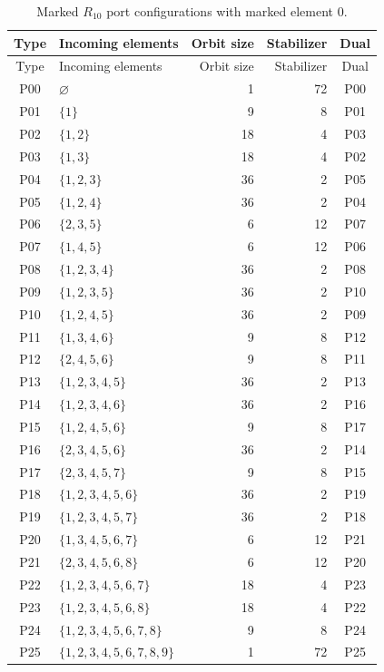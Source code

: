 \documentclass[11pt]{article}
\numberwithin{equation}{section}
\theoremstyle{remark}
\begin{document}
\begin{center}
\small
\begin{longtable}{c l r r c}
\caption{Marked $R_{10}$ port configurations with marked element $0$.}\label{tab:r10-marked-configurations}\\
\hline
Type & Incoming elements & Orbit size & Stabilizer & Dual \\
\hline
\endfirsthead
\hline
Type & Incoming elements & Orbit size & Stabilizer & Dual \\
\hline
\endhead
P00 & $\varnothing$ & 1 & 72 & P00 \\
P01 & $\{1\}$ & 9 & 8 & P01 \\
P02 & $\{1,2\}$ & 18 & 4 & P03 \\
P03 & $\{1,3\}$ & 18 & 4 & P02 \\
P04 & $\{1,2,3\}$ & 36 & 2 & P05 \\
P05 & $\{1,2,4\}$ & 36 & 2 & P04 \\
P06 & $\{2,3,5\}$ & 6 & 12 & P07 \\
P07 & $\{1,4,5\}$ & 6 & 12 & P06 \\
P08 & $\{1,2,3,4\}$ & 36 & 2 & P08 \\
P09 & $\{1,2,3,5\}$ & 36 & 2 & P10 \\
P10 & $\{1,2,4,5\}$ & 36 & 2 & P09 \\
P11 & $\{1,3,4,6\}$ & 9 & 8 & P12 \\
P12 & $\{2,4,5,6\}$ & 9 & 8 & P11 \\
P13 & $\{1,2,3,4,5\}$ & 36 & 2 & P13 \\
P14 & $\{1,2,3,4,6\}$ & 36 & 2 & P16 \\
P15 & $\{1,2,4,5,6\}$ & 9 & 8 & P17 \\
P16 & $\{2,3,4,5,6\}$ & 36 & 2 & P14 \\
P17 & $\{2,3,4,5,7\}$ & 9 & 8 & P15 \\
P18 & $\{1,2,3,4,5,6\}$ & 36 & 2 & P19 \\
P19 & $\{1,2,3,4,5,7\}$ & 36 & 2 & P18 \\
P20 & $\{1,3,4,5,6,7\}$ & 6 & 12 & P21 \\
P21 & $\{2,3,4,5,6,8\}$ & 6 & 12 & P20 \\
P22 & $\{1,2,3,4,5,6,7\}$ & 18 & 4 & P23 \\
P23 & $\{1,2,3,4,5,6,8\}$ & 18 & 4 & P22 \\
P24 & $\{1,2,3,4,5,6,7,8\}$ & 9 & 8 & P24 \\
P25 & $\{1,2,3,4,5,6,7,8,9\}$ & 1 & 72 & P25 \\
\hline
\end{longtable}
\end{center}
\end{document}
